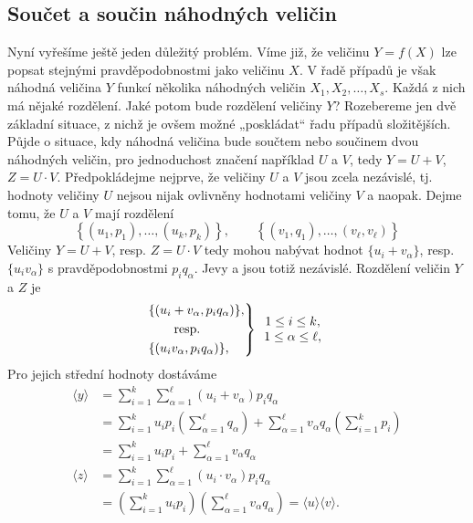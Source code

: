     \subsection{Součet a součin náhodných veličin}
      Nyní vyřešíme ještě jeden důležitý problém. Víme již, že veličinu \(Y = f(X)\) lze popsat 
      stejnými pravděpodobnostmi jako veličinu \(X\). V řadě případů je však náhodná veličina \(Y\) 
      funkcí několika náhodných veličin \(X_1, X_2, \ldots, X_s\). Každá z nich má nějaké 
      rozdělení. Jaké potom bude rozdělení veličiny \(Y\)? Rozebereme jen dvě základní situace, z 
      nichž je ovšem možné „poskládat“ řadu případů složitějších. Půjde o situace, kdy náhodná 
      veličina bude součtem nebo součinem dvou náhodných veličin, pro jednoduchost značení 
      například \(U\) a \(V\), tedy \(Y = U + V\), \(Z = U \cdot V\). Předpokládejme nejprve, že 
      veličiny \(U\) a \(V\) jsou zcela nezávislé, tj. hodnoty veličiny \(U\) nejsou nijak 
      ovlivněny hodnotami veličiny \(V\) a naopak. Dejme tomu, že \(U\) a \(V\) mají rozdělení
      \begin{equation*}
        \left\lbrace (u_1, p_1), \ldots, (u_k, p_k) \right\rbrace, \qquad
        \left\lbrace (v_1, q_1), \ldots, (v_\ell, v_\ell) \right\rbrace
      \end{equation*}
      Veličiny \(Y = U + V\), resp. \(Z = U \cdot V\) tedy mohou nabývat hodnot \(\lbrace u_i + 
      v_\alpha\rbrace\), resp. \(\lbrace u_i v_\alpha\rbrace\) s pravděpodobnostmi \(p_iq_\alpha\). 
      Jevy  a  jsou totiž nezávislé. Rozdělení veličin \(Y\) a \(Z\) je 
      \begin{equation*}
          \begin{rcases}
            \lbrace (u_i +v_\alpha, p_iq_\alpha)\rbrace,\\
            \qquad\text{resp.}\\
            \lbrace(u_iv_\alpha, p_iq_\alpha)\rbrace,
          \end{rcases}
        \begin{array}{c}
          1\leq i\leq k,\\
          1\leq\alpha\leq\ell,
        \end{array}
      \end{equation*}
      Pro jejich střední hodnoty dostáváme
      \begin{align*}
        \langle y \rangle 
          &= \sum_{i=1}^{k}\sum_{\alpha=1}^{\ell}(u_i + v_\alpha)p_iq_\alpha        \\
          &= \sum_{i=1}^{k}u_ip_i\left(\sum_{\alpha=1}^{\ell}q_\alpha\right) + 
             \sum_{\alpha=1}^{\ell}v_\alpha q_\alpha\left(\sum_{i=1}^{k}p_i\right)  \\
          &= \sum_{i=1}^{k}u_ip_i + \sum_{\alpha=1}^{\ell}v_\alpha q_\alpha         \\
        \langle z \rangle 
          &= \sum_{i=1}^{k}\sum_{\alpha=1}^{\ell}(u_i \cdot v_\alpha)p_iq_\alpha    \\
          &= \left(\sum_{i=1}^{k}u_ip_i\right)
             \left(\sum_{\alpha=1}^{\ell}v_\alpha q_\alpha\right) 
           = \langle u \rangle \langle v \rangle.
      \end{align*}
